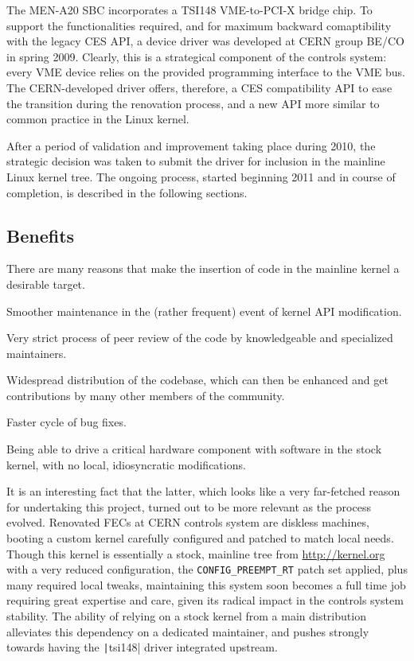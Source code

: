 \documentclass{JAC2003}
\begin{document}
The MEN-A20 SBC incorporates a TSI148 VME-to-PCI-X bridge chip.
To support the functionalities required, and for maximum backward
comaptibility with the legacy CES API, a device driver was developed 
at CERN group BE/CO in spring 2009. Clearly, this is a strategical
component of the controls system: every VME device relies on the
provided programming interface to the VME bus. The CERN-developed driver
offers, therefore, a CES compatibility API to ease the transition during
the renovation process, and a new API more similar to common practice
in the Linux kernel.

After a period of validation and improvement taking place during 2010,
the strategic decision was taken to submit the driver for
inclusion in the mainline Linux kernel tree. The ongoing process, started
beginning 2011 and in course of completion, is described in the following
sections.

\subsection{Benefits}

There are many reasons that make the insertion of code in the mainline
kernel a desirable target.

\begin{Itemize}
\item Smoother maintenance in the (rather frequent) event of kernel API
    modification.
\item Very strict process of peer review of the code by knowledgeable
    and specialized maintainers.
\item Widespread distribution of the codebase, which can then be
    enhanced and get contributions by many other members of the community.
\item Faster cycle of bug fixes.
\item Being able to drive a critical hardware component with software
    in the stock kernel, with no local, idiosyncratic modifications.
\end{Itemize}

It is an interesting fact that the latter, which looks like a very
far-fetched reason for undertaking this project, turned out to be more
relevant as the process evolved. Renovated FECs at CERN controls system
are diskless machines, booting a custom kernel carefully configured and
patched to match local needs. Though this kernel is essentially a stock,
mainline tree from \url{http://kernel.org} with a very reduced 
configuration, the \verb|CONFIG_PREEMPT_RT|
patch set applied, plus many required local
tweaks, maintaining this system soon becomes a full time job requiring
great expertise and care, given its radical impact in the controls
system stability. The ability of relying on a stock kernel from a main
distribution alleviates this dependency on a dedicated maintainer, and
pushes strongly towards having the \texttt|tsi148| driver integrated
upstream.
\end{document}
